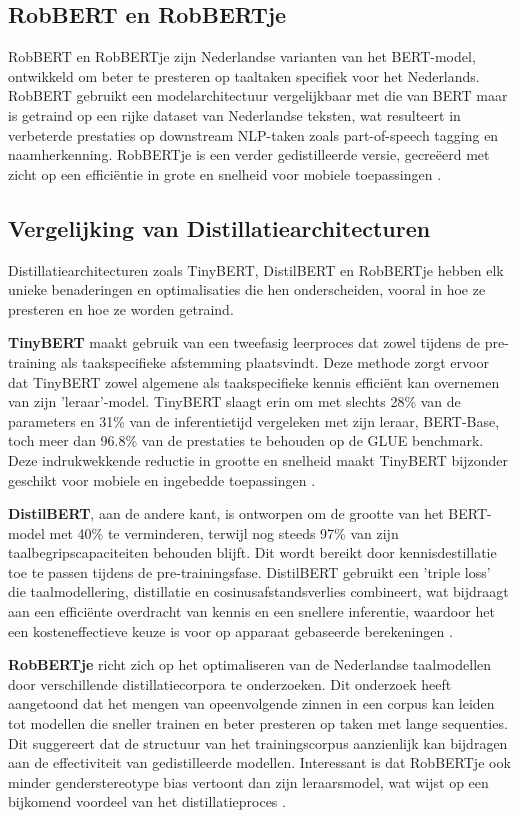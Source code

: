 \subsection{RobBERT en RobBERTje}

RobBERT en RobBERTje zijn Nederlandse varianten van het BERT-model, ontwikkeld om beter te presteren op taaltaken specifiek voor het Nederlands. RobBERT gebruikt een modelarchitectuur vergelijkbaar met die van BERT maar is getraind op een rijke dataset van Nederlandse teksten, wat resulteert in verbeterde prestaties op downstream NLP-taken zoals part-of-speech tagging en naamherkenning. RobBERTje is een verder gedistilleerde versie, gecreëerd met zicht op een efficiëntie in grote en snelheid voor mobiele toepassingen \autocite{Vries2019}.

\subsection{Vergelijking van Distillatiearchitecturen}

Distillatiearchitecturen zoals TinyBERT, DistilBERT en RobBERTje hebben elk unieke benaderingen en optimalisaties die hen onderscheiden, vooral in hoe ze presteren en hoe ze worden getraind.

\textbf{TinyBERT} maakt gebruik van een tweefasig leerproces dat zowel tijdens de pre-training als taakspecifieke afstemming plaatsvindt. Deze methode zorgt ervoor dat TinyBERT zowel algemene als taakspecifieke kennis efficiënt kan overnemen van zijn 'leraar'-model. TinyBERT slaagt erin om met slechts 28\% van de parameters en 31\% van de inferentietijd vergeleken met zijn leraar, BERT-Base, toch meer dan 96.8\% van de prestaties te behouden op de GLUE benchmark. Deze indrukwekkende reductie in grootte en snelheid maakt TinyBERT bijzonder geschikt voor mobiele en ingebedde toepassingen \autocite{Jiao2019TinyBERT}.

\textbf{DistilBERT}, aan de andere kant, is ontworpen om de grootte van het BERT-model met 40\% te verminderen, terwijl nog steeds 97\% van zijn taalbegripscapaciteiten behouden blijft. Dit wordt bereikt door kennisdestillatie toe te passen tijdens de pre-trainingsfase. DistilBERT gebruikt een 'triple loss' die taalmodellering, distillatie en cosinusafstandsverlies combineert, wat bijdraagt aan een efficiënte overdracht van kennis en een snellere inferentie, waardoor het een kosteneffectieve keuze is voor op apparaat gebaseerde berekeningen \autocite{Sanh2019DistilBERT}.

\textbf{RobBERTje} richt zich op het optimaliseren van de Nederlandse taalmodellen door verschillende distillatiecorpora te onderzoeken. Dit onderzoek heeft aangetoond dat het mengen van opeenvolgende zinnen in een corpus kan leiden tot modellen die sneller trainen en beter presteren op taken met lange sequenties. Dit suggereert dat de structuur van het trainingscorpus aanzienlijk kan bijdragen aan de effectiviteit van gedistilleerde modellen. Interessant is dat RobBERTje ook minder genderstereotype bias vertoont dan zijn leraarsmodel, wat wijst op een bijkomend voordeel van het distillatieproces \autocite{Delobelle2021}.

